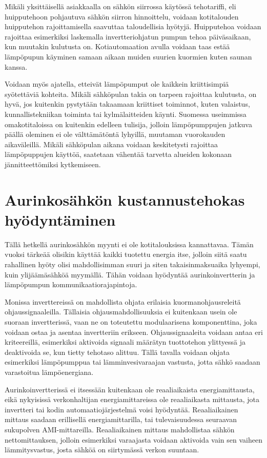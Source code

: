   Mikäli yksittäisellä asiakkaalla on sähkön siirrossa käytössä tehotariffi, eli huipputehoon pohjautuva sähkön siirron hinnoittelu, voidaan kotitalouden huipputehon rajoittamisella saavuttaa taloudellisia hyötyjä. Huipputehoa voidaan rajoittaa esimerkiksi laskemalla invertteriohjatun pumpun tehoa päiväsaikaan, kun muutakin kulutusta on. Kotiautomaation avulla voidaan taas estää lämpöpupun käyminen samaan aikaan muiden suurien kuormien kuten saunan kanssa.

  Voidaan myös ajatella, etteivät lämpöpumput ole kaikkein kriittisimpiä syötettäviä kohteita. Mikäli sähköpulan takia on tarpeen rajoittaa kulutusta, on hyvä, jos kuitenkin pystytään takaamaan kriittiset toiminnot, kuten valaistus, kunnallistekniikan toiminta tai kylmälaitteiden käynti. Suomessa useimmissa omakotitaloissa on kuitenkin edelleen tulisija, jolloin lämpöpumppujen jatkuva päällä oleminen ei ole välttämätöntä lyhyillä, muutaman vuorokauden aikaväleillä. Mikäli sähköpulan aikana voidaan keskitetysti rajoittaa lämpöpuppujen käyttöä, saatetaan vähentää tarvetta alueiden kokonaan jännitteettömiksi kytkemiseen.

\section{Aurinkosähkön kustannustehokas hyödyntäminen}

  Tällä hetkellä aurinkosähkön myynti ei ole kotitalouksissa kannattavaa. Tämän vuoksi tärkeää olisikin käyttää kaikki tuotettu energia itse, jolloin siitä saatu rahallinen hyöty olisi mahdollisimman suuri ja siten takaisinmaksuaika lyhyempi, kuin ylijäämäsähköä myymällä. Tähän voidaan hyödyntää aurinkoinvertterin ja lämpöpumpun kommunikaatiorajapintoja.

  Monissa inverttereissä on mahdollista ohjata erilaisia kuormanohjausreleitä ohjaussignaaleilla. Tällaisia ohjausmahdollisuuksia ei kuitenkaan usein ole suoraan invertterissä, vaan ne on toteutettu modulaarisena komponenttina, joka voidaan ostaa ja asentaa invertteriin erikseen. Ohjaussignaaleita voidaan antaa eri kriteereillä, esimerkiksi aktivoida signaali määrätyn tuottotehon ylittyessä ja deaktivoida se, kun tietty tehotaso alittuu. Tällä tavalla voidaan ohjata esimerkiksi lämpöpumppua tai lämminvesivaraajan vastusta, jotta sähkö saadaan varastoitua lämpöenergiana.

  Aurinkoinvertterissä ei itsessään kuitenkaan ole reaaliaikaista energiamittausta, eikä nykyisissä verkonhaltijan energiamittareissa ole reaaliaikasta mittausta, jota invertteri tai kodin automaatiojärjestelmä voisi hyödyntää. Reaaliaikainen mittaus saadaan erillisellä energiamittarilla, tai tulevaisuudessa seuraavan sukupolven AMI-mittareilla. Reaaliaikainen mittaus mahdollistaa sähkön nettomittauksen, jolloin esimerkiksi varaajasta voidaan aktivoida vain sen vaiheen lämmitysvastus, josta sähköä on siirtymässä verkon suuntaan.

